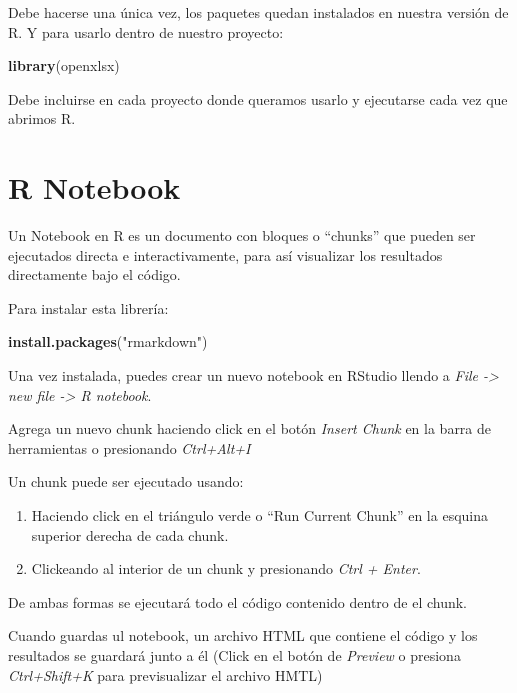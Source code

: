 \documentclass[
]{book}
\newenvironment{Shaded}{\begin{snugshade}}{\end{snugshade}}
\newcommand{\FunctionTok}[1]{\textcolor[rgb]{0.13,0.29,0.53}{\textbf{#1}}}
\newcommand{\NormalTok}[1]{#1}
\newcommand{\StringTok}[1]{\textcolor[rgb]{0.31,0.60,0.02}{#1}}
\begin{document}
Debe hacerse una única vez, los paquetes quedan instalados en nuestra
versión de R. Y para usarlo dentro de nuestro proyecto:

\begin{Shaded}
\begin{Highlighting}[]
\FunctionTok{library}\NormalTok{(openxlsx)}
\end{Highlighting}
\end{Shaded}

Debe incluirse en cada proyecto donde queramos usarlo y ejecutarse cada
vez que abrimos R.

\hypertarget{r-notebook}{%
\section{R Notebook}\label{r-notebook}}

Un Notebook en R es un documento con bloques o ``chunks'' que pueden ser
ejecutados directa e interactivamente, para así visualizar los
resultados directamente bajo el código.

Para instalar esta librería:

\begin{Shaded}
\begin{Highlighting}[]
\FunctionTok{install.packages}\NormalTok{(}\StringTok{"rmarkdown"}\NormalTok{)}
\end{Highlighting}
\end{Shaded}

Una vez instalada, puedes crear un nuevo notebook en RStudio llendo a
\emph{File -\textgreater{} new file -\textgreater{} R notebook}.

Agrega un nuevo chunk haciendo click en el botón \emph{Insert Chunk} en la
barra de herramientas o presionando \emph{Ctrl+Alt+I}

Un chunk puede ser ejecutado usando:

\begin{enumerate}
\def\labelenumi{\arabic{enumi}.}
\item
  Haciendo click en el triángulo verde o ``Run Current Chunk'' en la
  esquina superior derecha de cada chunk.
\item
  Clickeando al interior de un chunk y presionando \emph{Ctrl + Enter}.
\end{enumerate}

De ambas formas se ejecutará todo el código contenido dentro de el
chunk.

Cuando guardas ul notebook, un archivo HTML que contiene el código y los
resultados se guardará junto a él (Click en el botón de \emph{Preview} o
presiona \emph{Ctrl+Shift+K} para previsualizar el archivo HMTL)
\end{document}
